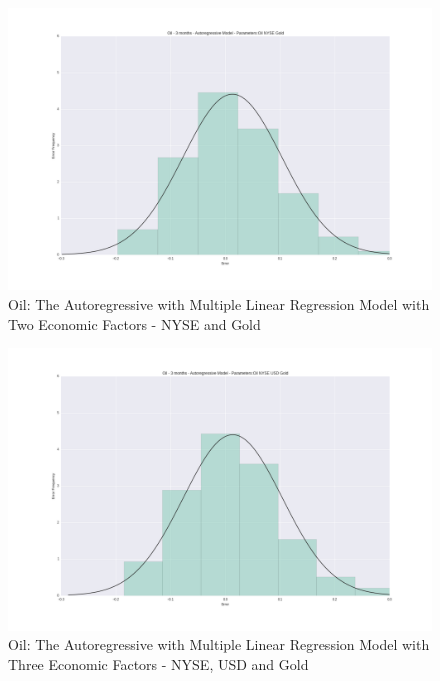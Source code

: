 \documentclass[runningheads]{llncs}
\begin{document}
\begin{figure}
\centering
\includegraphics[width=\textwidth]{Oil_NYSE_Gold.png}
\caption{Oil: The Autoregressive with Multiple Linear Regression Model with Two Economic Factors - NYSE and Gold}
\label{fig:Oil_NYSE_Gold.png}
\end{figure}

\begin{figure}
\centering
\includegraphics[width=\textwidth]{Oil_NYSE_USD_Gold.png}
\caption{Oil: The Autoregressive with Multiple Linear Regression Model with Three Economic Factors - NYSE, USD and Gold}
\label{fig:Oil_NYSE_USD_Gold.png}
\end{figure}
\end{document}
